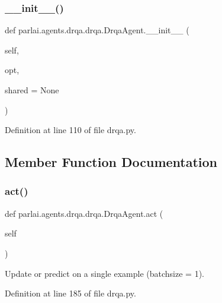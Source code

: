 \subsubsection{\texorpdfstring{\+\_\+\+\_\+init\+\_\+\+\_\+()}{\_\_init\_\_()}}
{\footnotesize\ttfamily def parlai.\+agents.\+drqa.\+drqa.\+Drqa\+Agent.\+\_\+\+\_\+init\+\_\+\+\_\+ (\begin{DoxyParamCaption}\item[{}]{self,  }\item[{}]{opt,  }\item[{}]{shared = {\ttfamily None} }\end{DoxyParamCaption})}



Definition at line 110 of file drqa.\+py.



\subsection{Member Function Documentation}
\mbox{\label{classparlai_1_1agents_1_1drqa_1_1drqa_1_1DrqaAgent_a2eac2d9d7425e7cbf19b06e2433205ff}} 
\subsubsection{\texorpdfstring{act()}{act()}}
{\footnotesize\ttfamily def parlai.\+agents.\+drqa.\+drqa.\+Drqa\+Agent.\+act (\begin{DoxyParamCaption}\item[{}]{self }\end{DoxyParamCaption})}

\begin{DoxyVerb}Update or predict on a single example (batchsize = 1).\end{DoxyVerb}
 

Definition at line 185 of file drqa.\+py.



